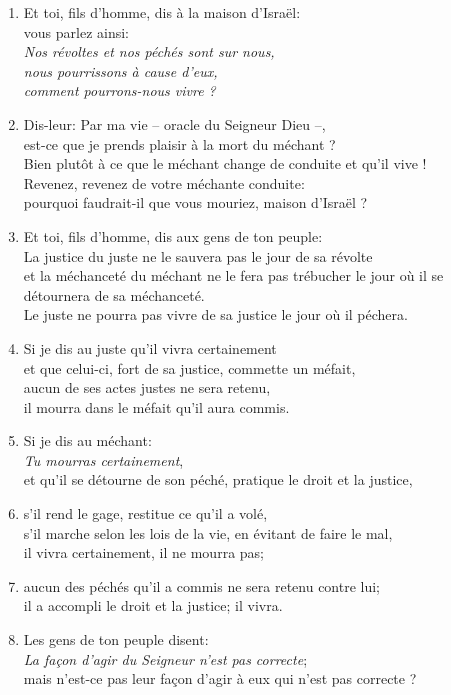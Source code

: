 \documentclass[12pt,a4paper,titlepage]{article}
\def \pslabelsep{0.2em} %
\def \psleftmargin{0em} %
\begin{document}
\begin{enumerate}[leftmargin=\psleftmargin, labelsep = \pslabelsep, label={\arabic*}, font=\color{\pscolor}\small\textsuperscript, parsep=0em, itemsep=0em, topsep=0em ]
\item Et toi, fils d’homme, dis à la maison d’Israël: \\ vous parlez ainsi: \\ \decalage \og{}\emph{Nos révoltes et nos péchés sont sur nous, \\ \decalage nous pourrissons à cause d’eux, \\ \decalage comment pourrons-nous vivre ?}\fg{} 
\item Dis-leur: Par ma vie – oracle du Seigneur Dieu –, \\ est-ce que je prends plaisir à la mort du méchant ? \\ Bien plutôt à ce que le méchant change de conduite et qu’il vive ! \\ Revenez, revenez de votre méchante conduite: \\ pourquoi faudrait-il que vous mouriez, maison d’Israël ? \verseSpace
\item Et toi, fils d’homme, dis aux gens de ton peuple: \\ La justice du juste ne le sauvera pas le jour de sa révolte \\ et la méchanceté du méchant ne le fera pas trébucher le jour où il se détournera de sa méchanceté.\\
Le juste ne pourra pas vivre de sa justice le jour où il péchera.
\item Si je dis au juste qu’il vivra certainement \\ et que celui-ci, fort de sa justice, commette un méfait, \\ aucun de ses actes justes ne sera retenu, \\ il mourra dans le méfait qu’il aura commis.
\item Si je dis au méchant: \\ \decalage \og{}\emph{Tu mourras certainement}\fg{}, \\ et qu’il se détourne de son péché, pratique le droit et la justice,
\item s’il rend le gage, restitue ce qu’il a volé, \\ s’il marche selon les lois de la vie, en évitant de faire le mal, \\ il vivra certainement, il ne mourra pas; 
\item aucun des péchés qu’il a commis ne sera retenu contre lui; \\ il a accompli le droit et la justice; il vivra. \verseSpace
\item Les gens de ton peuple disent: \\ \decalage \og{}\emph{La façon d’agir du Seigneur n’est pas correcte}\fg{}; \\ mais n’est-ce pas leur façon d’agir à eux qui n’est pas correcte ?

\end{enumerate}
\end{document}
